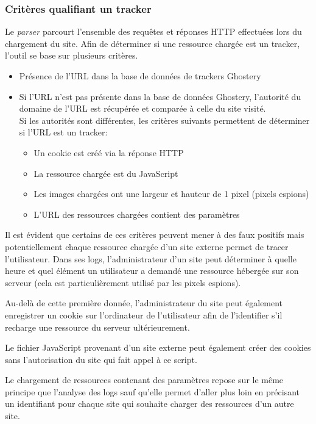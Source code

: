 \subsubsection{Critères qualifiant un tracker}
Le \textit{parser} parcourt l'ensemble des requêtes et réponses HTTP effectuées lors du chargement du site. Afin de déterminer si une ressource chargée est un tracker, l'outil se base sur plusieurs critères.
\begin{itemize}
  \renewcommand{\labelitemi}{$\Rightarrow$}
 \item Présence de l'URL dans la base de données de trackers Ghostery
 \item Si l'URL n'est pas présente dans la base de données Ghostery, l'autorité du domaine de l'URL est récupérée et comparée à celle du site visité.\\
		Si les autorités sont différentes, les critères suivants permettent de déterminer si l'URL est un tracker:
		\begin{itemize}
			\item Un cookie est créé via la réponse HTTP
			\item La ressource chargée est du JavaScript
			\item Les images chargées ont une largeur et hauteur de 1 pixel (pixels espions)
			\item L'URL des ressources chargées contient des paramètres
			\newline
		\end{itemize}
\end{itemize}

Il est évident que certains de ces critères peuvent mener à des faux positifs mais potentiellement chaque ressource chargée d'un site externe permet de tracer l'utilisateur. Dans ses logs, l'administrateur d'un site peut déterminer à quelle heure et quel élément un utilisateur a demandé une ressource hébergée sur son serveur (cela est particulièrement utilisé par les pixels espions).

Au-delà de cette première donnée, l'administrateur du site peut également enregistrer un cookie sur l'ordinateur de l'utilisateur afin de l'identifier s'il recharge une ressource du serveur ultérieurement.

Le fichier JavaScript provenant d'un site externe peut également créer des cookies sans l'autorisation du site qui fait appel à ce script.

Le chargement de ressources contenant des paramètres repose sur le même principe que l'analyse des logs sauf qu'elle permet d'aller plus loin en précisant un identifiant pour chaque site qui souhaite charger des ressources d'un autre site.

